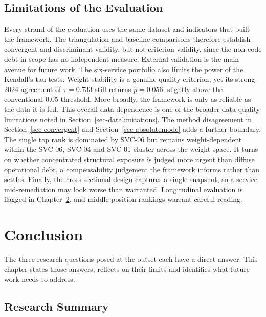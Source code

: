 \documentclass[
  12pt,
  letterpaper,
  12pt,
  oneside,
  english,
  onehalfspacing,
  headsepline]{MastersDoctoralThesis}
\begin{document}
\section{Limitations of the Evaluation}\label{sec-evaluationlimitations}

Every strand of the evaluation uses the same dataset and indicators that
built the framework. The triangulation and baseline comparisons
therefore establish convergent and discriminant validity, but not
criterion validity, since the non-code debt in scope has no independent
measure. External validation is the main avenue for future work. The
six-service portfolio also limits the power of the Kendall's tau tests.
Weight stability is a genuine quality criterion, yet its strong 2024
agreement of \(\tau = 0.733\) still returns \(p = 0.056\), slightly
above the conventional 0.05 threshold. More broadly, the framework is
only as reliable as the data it is fed. This overall data dependence is
one of the broader data quality limitations noted in
Section~\ref{sec-datalimitations}. The method disagreement in
Section~\ref{sec-convergent} and Section~\ref{sec-absolutemode} adds a
further boundary. The single top rank is dominated by SVC-06 but remains
weight-dependent within the SVC-06, SVC-04 and SVC-01 cluster across the
weight space. It turns on whether concentrated structural exposure is
judged more urgent than diffuse operational debt, a compensability
judgement the framework informs rather than settles. Finally, the
cross-sectional design captures a single snapshot, so a service
mid-remediation may look worse than warranted. Longitudinal evaluation
is flagged in Chapter~\ref{sec-chapter6}, and middle-position rankings
warrant careful reading.


\chapter{Conclusion}\label{sec-chapter6}

The three research questions posed at the outset each have a direct
answer. This chapter states those answers, reflects on their limits and
identifies what future work needs to address.

\section{Research Summary}\label{research-summary}
\end{document}
